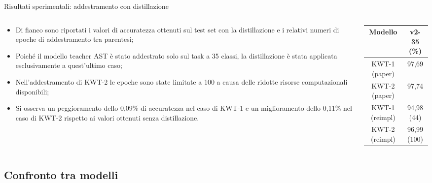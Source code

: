 \documentclass[aspectratio=169]{beamer}
\begin{document}
\begin{frame}{Risultati sperimentali: addestramento con distillazione}
  \begin{columns}[c]
    \begin{column}{0.6\textwidth}
      \begin{itemize}
        \item Di fianco sono riportati i valori di accuratezza ottenuti sul test set con la distillazione e i relativi numeri di epoche di addestramento tra parentesi;
        \item Poiché il modello teacher AST è stato addestrato solo sul task a 35 classi, la distillazione è stata applicata esclusivamente a quest'ultimo caso;
        \item Nell'addestramento di KWT-2 le epoche sono state limitate a 100 a causa delle ridotte risorse computazionali disponibili;
        \item Si osserva un peggioramento dello 0,09\% di accuratezza nel caso di KWT-1 e un miglioramento dello 0,11\% nel caso di KWT-2 rispetto ai valori ottenuti senza distillazione.
      \end{itemize}
    \end{column}
    \begin{column}{0.4\textwidth}
      \centering
      \begin{tabular}{cc}
        \toprule
        \textbf{Modello} & \textbf{v2-35 (\%)} \\
        \midrule
        KWT-1 (paper) & 97,69 \\
        KWT-2 (paper) & 97,74 \\
        \midrule
        KWT-1 (reimpl) & 94,98 (44) \\
        KWT-2 (reimpl) & 96,99 (100) \\
        \bottomrule
      \end{tabular}
    \end{column}
  \end{columns}
\end{frame}

\subsection{Confronto tra modelli}
\end{document}

